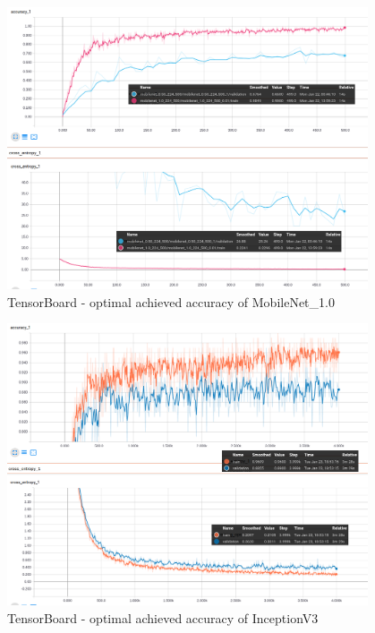 \begin{figure}[htbp]
\centering
\includegraphics[width=0.95\textwidth]{includes/MobileNet10-500res}
\caption{TensorBoard - optimal achieved accuracy of MobileNet_1.0}
\label{fig:MobileNet10-500res}
\end{figure}

\begin{figure}[htbp]
\centering
\includegraphics[width=0.95\textwidth]{includes/inception4000res}
\caption{TensorBoard - optimal achieved accuracy of InceptionV3}
\label{fig:inception4000res}
\end{figure}

